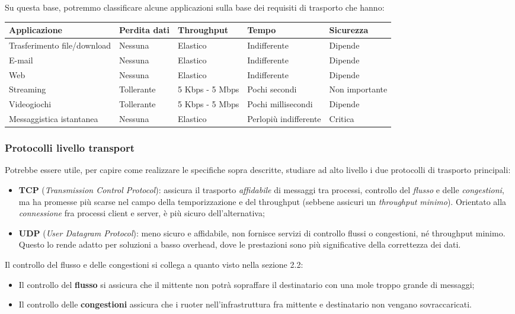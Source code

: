 \documentclass[a4paper,11pt]{article}
\begin{document}
Su questa base, potremmo classificare alcune applicazioni sulla base dei requisiti di trasporto che hanno:
\begin{table}[H]
	\center {}
	\begin{tabular} { p{3cm} || p{2.5cm} | p{2.5cm} | p{2.5cm} | p{2.5cm} }
		\bfseries Applicazione & \bfseries Perdita dati & \bfseries Throughput & \bfseries Tempo & \bfseries Sicurezza \\ 
		\hline
		Trasferimento file/download & Nessuna & Elastico & Indifferente & Dipende \\
		E-mail & Nessuna & Elastico & Indifferente & Dipende \\ 
		Web & Nessuna & Elastico & Indifferente & Dipende \\ 
		Streaming & Tollerante & 5 Kbps - 5 Mbps & Pochi secondi & Non importante \\ 
		Videogiochi & Tollerante & 5 Kbps - 5 Mbps & Pochi millisecondi & Dipende \\ 
		Messaggistica istantanea & Nessuna & Elastico & Perlopiù indifferente & Critica \\ 
	\end{tabular}
\end{table}

\subsubsection{Protocolli livello transport}
Potrebbe essere utile, per capire come realizzare le specifiche sopra descritte, studiare ad alto livello i due protocolli di trasporto principali:
\begin{itemize}
	\item \textbf{TCP} (\textit{Transmission Control Protocol}): assicura il trasporto \textit{affidabile} di messaggi tra processi, controllo del \textit{flusso} e delle \textit{congestioni}, ma ha promesse più scarse nel campo della temporizzazione e del throughput (sebbene assicuri un \textit{throughput minimo}).
		Orientato alla \textit{connessione} fra processi client e server, è più sicuro dell'alternativa;
	\item \textbf{UDP} (\textit{User Datagram Protocol}): meno sicuro e affidabile, non fornisce servizi di controllo flussi o congestioni, né throughput minimo. Questo lo rende adatto per soluzioni a basso overhead, dove le prestazioni sono più significative della correttezza dei dati.
\end{itemize}

Il controllo del flusso e delle congestioni si collega a quanto visto nella sezione 2.2:
\begin{itemize}
	\item Il controllo del \textbf{flusso} si assicura che il mittente non potrà sopraffare il destinatario con una mole troppo grande di messaggi;
	\item Il controllo delle \textbf{congestioni} assicura che i ruoter nell'infrastruttura fra mittente e destinatario non vengano sovraccaricati.
\end{itemize}
\end{document}
